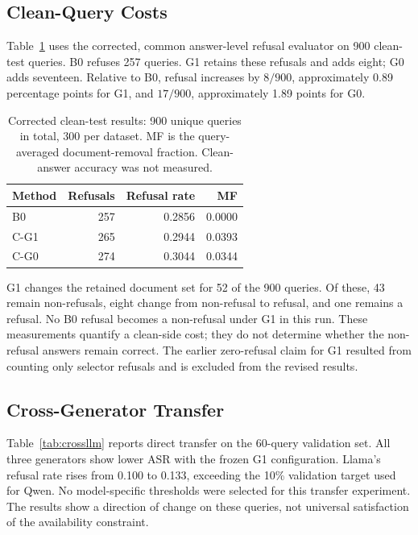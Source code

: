 \documentclass[sigconf]{acmart}
\begin{document}
\subsection{Clean-Query Costs}

Table~\ref{tab:clean} uses the corrected, common answer-level refusal evaluator on 900 clean-test queries. B0 refuses 257 queries. G1 retains these refusals and adds eight; G0 adds seventeen. Relative to B0, refusal increases by $8/900$, approximately 0.89 percentage points for G1, and $17/900$, approximately 1.89 points for G0.

\begin{table}[t]
  \caption{Corrected clean-test results: 900 unique queries in total, 300 per dataset. MF is the query-averaged document-removal fraction. Clean-answer accuracy was not measured.}
  \label{tab:clean}
  \centering
  \small
  \setlength{\tabcolsep}{4pt}
  \begin{tabular}{lrrr}
    \toprule
    Method & Refusals & Refusal rate & MF \\
    \midrule
    B0 & 257 & 0.2856 & 0.0000 \\
    C-G1 & 265 & 0.2944 & 0.0393 \\
    C-G0 & 274 & 0.3044 & 0.0344 \\
    \bottomrule
  \end{tabular}
\end{table}

G1 changes the retained document set for 52 of the 900 queries. Of these, 43 remain non-refusals, eight change from non-refusal to refusal, and one remains a refusal. No B0 refusal becomes a non-refusal under G1 in this run. These measurements quantify a clean-side cost; they do not determine whether the non-refusal answers remain correct. The earlier zero-refusal claim for G1 resulted from counting only selector refusals and is excluded from the revised results.

\subsection{Cross-Generator Transfer}

Table~\ref{tab:crossllm} reports direct transfer on the 60-query validation set. All three generators show lower ASR with the frozen G1 configuration. Llama's refusal rate rises from 0.100 to 0.133, exceeding the 10\% validation target used for Qwen. No model-specific thresholds were selected for this transfer experiment. The results show a direction of change on these queries, not universal satisfaction of the availability constraint.
\end{document}

